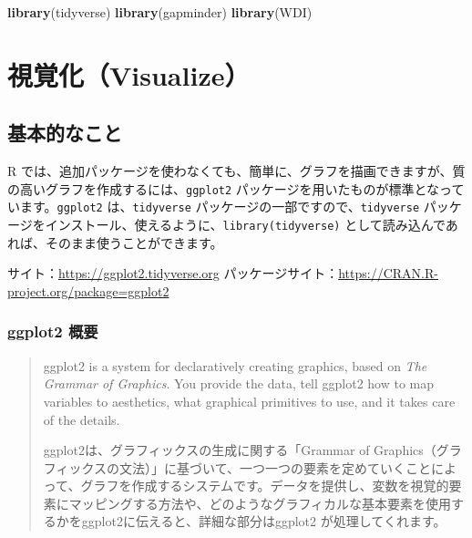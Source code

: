 \documentclass[
  xelatex, ja=standard]{bxjsbook}
\newenvironment{Shaded}{\begin{snugshade}}{\end{snugshade}}
\newcommand{\FunctionTok}[1]{\textcolor[rgb]{0.13,0.29,0.53}{\textbf{#1}}}
\newcommand{\NormalTok}[1]{#1}
\theoremstyle{definition}
\theoremstyle{definition}
\theoremstyle{definition}
\theoremstyle{definition}
\theoremstyle{remark}
\begin{document}
\begin{Shaded}
\begin{Highlighting}[]
\FunctionTok{library}\NormalTok{(tidyverse)}
\FunctionTok{library}\NormalTok{(gapminder)}
\FunctionTok{library}\NormalTok{(WDI)}
\end{Highlighting}
\end{Shaded}

\hypertarget{section}{%
\subsubsection{}\label{section}}

\hypertarget{visualize}{%
\chapter{視覚化（Visualize）}\label{visualize}}

\hypertarget{ux57faux672cux7684ux306aux3053ux3068}{%
\section{基本的なこと}\label{ux57faux672cux7684ux306aux3053ux3068}}

R では、追加パッケージを使わなくても、簡単に、グラフを描画できますが、質の高いグラフを作成するには、\texttt{ggplot2} パッケージを用いたものが標準となっています。\texttt{ggplot2} は、\texttt{tidyverse} パッケージの一部ですので、\texttt{tidyverse} パッケージをインストール、使えるように、\texttt{library(tidyverse)} として読み込んであれば、そのまま使うことができます。

サイト：\url{https://ggplot2.tidyverse.org} パッケージサイト：\url{https://CRAN.R-project.org/package=ggplot2}

\hypertarget{ggplot2-ux6982ux8981}{%
\subsection{ggplot2 概要}\label{ggplot2-ux6982ux8981}}

\begin{quote}
ggplot2 is a system for declaratively creating graphics, based on \emph{The Grammar of Graphics}. You provide the data, tell ggplot2 how to map variables to aesthetics, what graphical primitives to use, and it takes care of the details.

ggplot2は、グラフィックスの生成に関する「Grammar of Graphics（グラフィックスの文法）」に基づいて、一つ一つの要素を定めていくことによって、グラフを作成するシステムです。データを提供し、変数を視覚的要素にマッピングする方法や、どのようなグラフィカルな基本要素を使用するかをggplot2に伝えると、詳細な部分はggplot2 が処理してくれます。
\end{quote}
\end{document}

